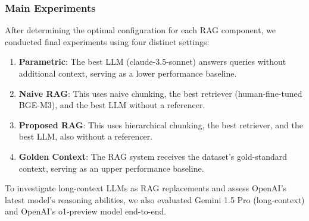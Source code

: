 


\subsubsection{Main Experiments}
\label{subsubsec: main_table}
After determining the optimal configuration for each RAG component, we conducted final experiments using four distinct settings:

\begin{enumerate}
    \item \textbf{Parametric}: The best LLM (claude-3.5-sonnet) answers queries without additional context, serving as a lower performance baseline.
    \item \textbf{Naive RAG}: This uses naive chunking, the best retriever (human-fine-tuned BGE-M3), and the best LLM without a referencer.
    \item \textbf{Proposed RAG}: This uses hierarchical chunking, the best retriever, and the best LLM, also without a referencer.
    \item \textbf{Golden Context}: The RAG system receives the dataset's gold-standard context, serving as an upper performance baseline.
\end{enumerate}

To investigate long-context LLMs as RAG replacements and assess OpenAI's latest model's reasoning abilities, we also evaluated Gemini 1.5 Pro (long-context) and OpenAI's o1-preview model end-to-end.

